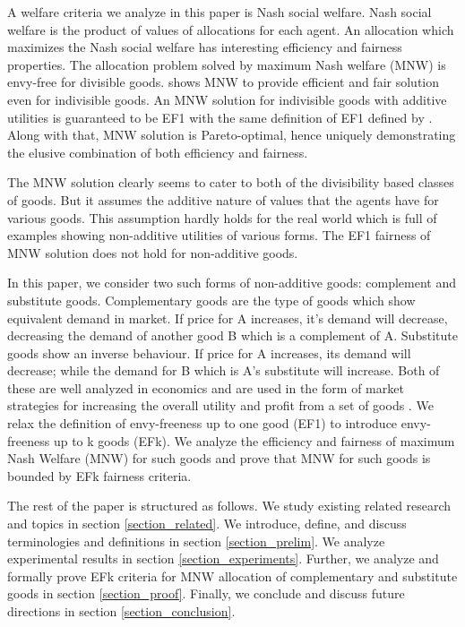 A welfare criteria we analyze in this paper is Nash social welfare. Nash social welfare is the product of values of allocations for each agent. An allocation which maximizes the Nash social welfare has interesting efficiency and fairness properties. The allocation problem solved by maximum Nash welfare (MNW) is envy-free for divisible goods. \citet{caragiannis2016unreasonable} shows MNW to provide efficient and fair solution even for indivisible goods. An MNW solution for indivisible goods with additive utilities is guaranteed to be EF1 \cite{caragiannis2016unreasonable} with the same definition of EF1 defined by \citet{budish2011combinatorial}. Along with that, MNW solution is Pareto-optimal, hence uniquely demonstrating the elusive combination of both efficiency and fairness.

The MNW solution clearly seems to cater to both of the divisibility based classes of goods. But it assumes the additive nature of values that the agents have for various goods. This assumption hardly holds for the real world which is full of examples showing non-additive utilities of various forms. The EF1 fairness of MNW solution does not hold for non-additive goods. 

In this paper, we consider two such forms of non-additive goods: complement and substitute goods. Complementary goods are the type of goods which show equivalent demand in market. If price for A increases, it's demand will decrease, decreasing the demand of another good B which is a complement of A. Substitute goods show an inverse behaviour. If price for A increases, its demand will decrease; while the demand for B which is A's substitute will increase. Both of these are well analyzed in economics and are used in the form of market strategies for increasing the overall utility and profit from a set of goods \cite{lewbel1985bundling, kojima1975international, bulow1985multimarket}. We relax the definition of envy-freeness up to one good (EF1) \cite{budish2011combinatorial} to introduce envy-freeness up to k goods (EFk). We analyze the efficiency and fairness of maximum Nash Welfare (MNW) for such goods and prove that MNW for such goods is bounded by EFk fairness criteria.

The rest of the paper is structured as follows. We study existing related research and topics in section \ref{section_related}. We introduce, define, and discuss terminologies and definitions in section \ref{section_prelim}. We analyze experimental results in section \ref{section_experiments}. Further, we analyze and formally prove EFk criteria for MNW allocation of complementary and substitute goods in section \ref{section_proof}. Finally, we conclude and discuss future directions in section \ref{section_conclusion}.

